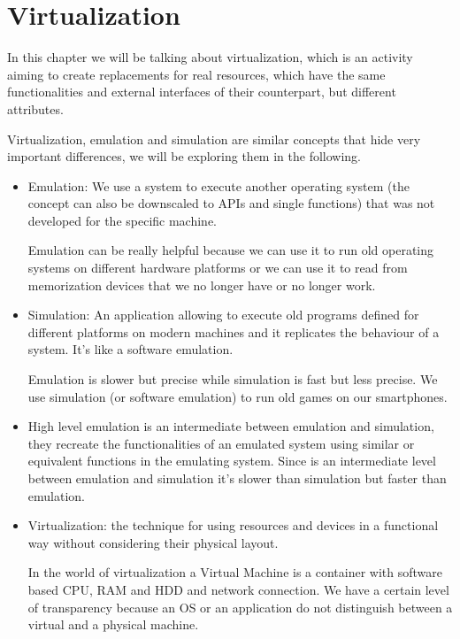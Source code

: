 \chapter{Virtualization}
In this chapter we will be talking about virtualization, which is an activity aiming to create replacements for real resources, which have the same functionalities and external interfaces of their counterpart, but different attributes.

Virtualization, emulation and simulation are similar concepts that hide very important differences, we will be exploring them in the following.
\begin{itemize}
    \item Emulation: We use a system to execute another operating system (the concept can also be downscaled to APIs and single functions) that was not developed for the specific machine.

    Emulation can be really helpful because we can use it to run old operating systems on different hardware platforms or we can use it to read from memorization devices that we no longer have or no longer work.
    \item Simulation: An application allowing to execute old programs defined for different platforms on modern machines and it replicates the behaviour of a system. It's like a software emulation.

    Emulation is slower but precise while simulation is fast but less precise. We use simulation (or software emulation) to run old games on our smartphones.
    \item High level emulation is an intermediate between emulation and simulation, they recreate the functionalities of an emulated system using similar or equivalent functions in the emulating system. Since is an intermediate level between emulation and simulation it's slower than simulation but faster than emulation.
    \item Virtualization: the technique for using resources and devices in a functional way without considering their physical layout.

    In the world of virtualization a Virtual Machine is a container with software based CPU, RAM and HDD and network connection. We have a certain level of transparency because an OS or an application do not distinguish between a virtual and a physical machine.
\end{itemize}
